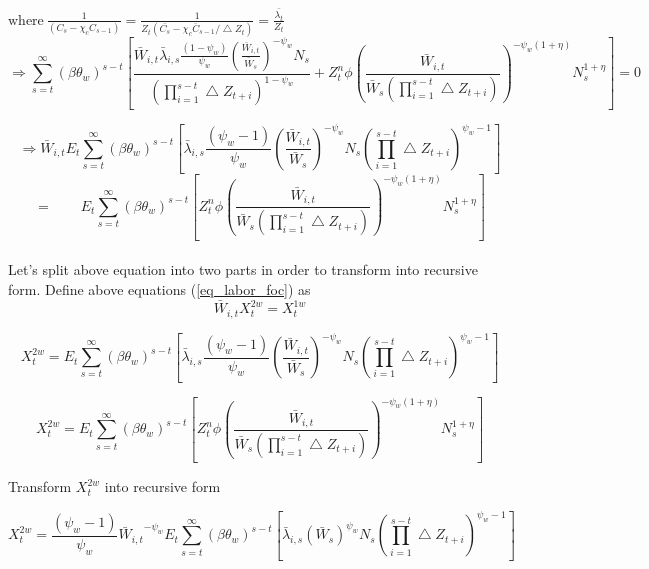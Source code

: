 \documentclass[11pt, a4paper]{article}
\begin{document}
$\text{where} ~\frac{1}{ ({C_s}-\chi_c {{C}_{s-1}})} = \frac{1}{ Z_t(\bar{C_s}-\chi_c {\bar{C}_{s-1}}/\bigtriangleup Z_t)} = \frac{\bar{\lambda_t}}{Z_t} $ \\


 \[
 \Rightarrow \sum_{s=t}^{\infty} (\beta \theta_w)^{s-t}\left[\frac{{\bar{W}_{i,t}}{\bar{\lambda}_{i,s}} \frac{(1-\psi_w)}{\psi_w}  \left(\frac{\bar{W}_{i,t}}{\bar{W}_{s}} \right)^{-\psi_w} N_s} { \left({\prod_{i=1}^{s-t} \bigtriangleup Z_{t+i}}\right)^{1-\psi_w}} + {{Z_t^n}\phi} \left( \frac{\bar{W}_{i,t}}{\bar{W}_s \left({\prod_{i=1}^{s-t} \bigtriangleup Z_{t+i}}\right)} \right)^{-\psi_w (1+\eta)} N_s^{1+\eta}\right]=0  \] 


\[\Rightarrow {\bar{W}_{i,t}}E_t \sum_{s=t}^{\infty} (\beta \theta_w)^{s-t}\left[{{\bar{\lambda}_{i,s}}\frac{(\psi_w-1)}{\psi_w}  \left(\frac{\bar{W}_{i,t}}{\bar{W}_{s}} \right)^{-\psi_w} N_s} { \left({\prod_{i=1}^{s-t} \bigtriangleup Z_{t+i}}\right)^{\psi_w-1}} \right] \]
\begin{equation}= \qquad E_t \sum_{s=t}^{\infty} (\beta \theta_w)^{s-t}\left[{{Z_t^n}\phi} \left( \frac{\bar{W}_{i,t}}{\bar{W}_s \left({\prod_{i=1}^{s-t} \bigtriangleup Z_{t+i}}\right)} \right)^{-\psi_w (1+\eta)} N_s^{1+\eta}\right] \label{eq_labor_foc} \end{equation} 
\\

Let's split above equation into two parts in order to transform into  recursive form. Define above equations (\ref{eq_labor_foc}) as 
 \begin{equation} {\bar{W}_{i,t}} X_t^{2w}=X_t^{1w}\end{equation}
 
 \[X_{t}^{2w} =E_t \sum_{s=t}^{\infty} (\beta \theta_w)^{s-t}\left[{{\bar{\lambda}_{i,s}}\frac{(\psi_w-1)}{\psi_w}  \left(\frac{\bar{W}_{i,t}}{\bar{W}_{s}} \right)^{-\psi_w} N_s} { \left({\prod_{i=1}^{s-t} \bigtriangleup Z_{t+i}}\right)^{\psi_w -1}} \right]\]

\[X_{t}^{2w} = E_t \sum_{s=t}^{\infty} (\beta \theta_w)^{s-t}\left[{{Z_t^n}\phi} \left( \frac{\bar{W}_{i,t}}{\bar{W}_s \left({\prod_{i=1}^{s-t} \bigtriangleup Z_{t+i}}\right)} \right)^{-\psi_w (1+\eta)} N_s^{1+\eta}\right]\]

 Transform $X_{t}^{2w}$ into recursive form
 
\[X_{t}^{2w} =\frac{(\psi_w-1)}{\psi_w} {\bar{W}_{i,t}}^{-\psi_w} E_t \sum_{s=t}^{\infty} (\beta \theta_w)^{s-t}\left[{{\bar{\lambda}_{i,s}}  \left({\bar{W}_{s}} \right)^{\psi_w} N_s} { \left({\prod_{i=1}^{s-t} \bigtriangleup Z_{t+i}}\right)^{\psi_w -1}} \right ] \]
\end{document}
